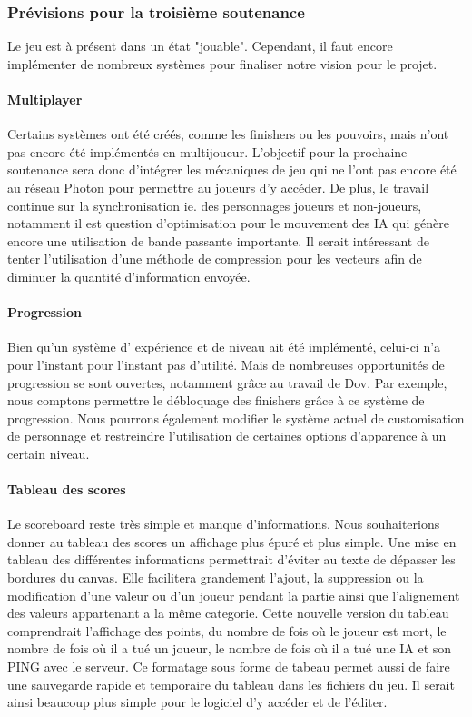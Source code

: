     \subsubsection{Prévisions pour la troisième soutenance}

        Le jeu est à présent dans un état "jouable". Cependant, il faut encore implémenter de nombreux systèmes pour finaliser notre vision pour le projet.

        \paragraph{Multiplayer}
        Certains systèmes ont été créés, comme les finishers ou les pouvoirs, mais n'ont pas encore été 
        implémentés en multijoueur. L'objectif pour la prochaine soutenance sera donc d'intégrer les mécaniques 
        de jeu qui ne l'ont pas encore été au réseau Photon pour permettre au joueurs d'y accéder. De plus, le 
        travail continue sur la synchronisation ie. des personnages joueurs et non-joueurs, notamment il est 
        question d'optimisation pour le mouvement des IA qui génère encore une utilisation de bande passante importante. 
        Il serait intéressant de tenter l'utilisation d'une méthode de compression pour les vecteurs afin de diminuer 
        la quantité d'information envoyée.

        \paragraph{Progression}
        Bien qu'un système d' expérience et de niveau ait été implémenté, celui-ci n'a pour l'instant pour 
        l'instant pas d'utilité. Mais de nombreuses opportunités de progression se sont ouvertes, 
        notamment grâce au travail de Dov. Par exemple, nous comptons permettre le débloquage des 
        finishers grâce à ce système de progression. Nous pourrons également modifier le système actuel 
        de customisation de personnage et restreindre l'utilisation de certaines options d'apparence à un certain niveau.

        \paragraph{Tableau des scores}
        Le scoreboard reste très simple et manque d’informations. Nous souhaiterions donner au tableau des scores un affichage plus épuré et plus simple. Une mise en tableau des différentes informations permettrait d’éviter au texte de dépasser les bordures du canvas. Elle facilitera grandement l’ajout, la suppression ou la modification d’une valeur ou d’un joueur pendant la partie ainsi que l’alignement des valeurs appartenant a la même categorie. 
        Cette nouvelle version du tableau comprendrait l'affichage des points, du nombre de fois où le joueur est mort, le nombre de fois où il a tué un joueur, le nombre de fois où il a tué une IA et son PING avec le serveur. Ce formatage sous forme de tabeau permet aussi de faire une sauvegarde rapide et temporaire du tableau dans les fichiers du jeu. Il serait ainsi beaucoup plus simple pour le logiciel d'y accéder et de l'éditer.
        
